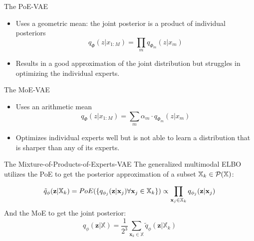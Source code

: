     \begin{frame}{The PoE-VAE}

        \begin{itemize}
            \item Uses a geometric mean: the joint posterior is a product of individual posteriors
            \begin{equation}
                q_{\Phi}(z|x_{1:M})=\prod _m q_{\Phi_m}(z|x_m)
            \end{equation}
            \item Results in a good approximation of the joint distribution but struggles in optimizing the individual experts.
        \end{itemize}

    \end{frame}

    \begin{frame}{The MoE-VAE}
        \begin{itemize}
            \item Uses an arithmetic mean
            \begin{equation}
                q_{\Phi}(z|x_{1:M})=\sum _m \alpha_m\cdot q_{\Phi_m}(z|x_m)
            \end{equation}
            \item Optimizes individual experts well but is not able to learn a distribution that is sharper than any of its experts.
        \end{itemize}

    \end{frame}

    \begin{frame}{The Mixture-of-Products-of-Experts-VAE}
        The generalized multimodal ELBO utilizes the PoE to get the posterior approximation of a subset $\mathbb{X}_k \in \mathcal{P}(\mathbb{X})$:

        \begin{equation}
            \tilde{q}_{\phi}(\textbf{z}|\mathbb{X}_k)=PoE(\{q_{\phi_j}(\textbf{z}|\textbf{x}_j) \forall \textbf{x}_j \in \mathbb{X}_k\}) \propto \prod _{\textbf{x}_j \in \mathbb{X}_k}q_{\phi_j}(\textbf{z}|\textbf{x}_j)
        \end{equation}
        And the MoE to get the joint posterior:
        \begin{equation}
            q_{\phi}(\textbf{z}|\mathbb{X}) = \frac{1}{2^3} \sum _{\textbf{x}_k \in \mathbb{X}} \tilde{q}_{\phi} (\textbf{z}|\mathbb{X}_k)
        \end{equation}
    \end{frame}

